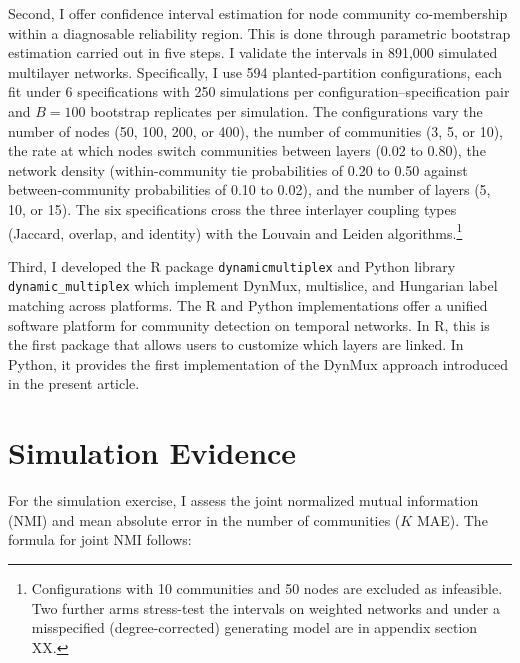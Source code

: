 \documentclass[11pt, letterpaper]{article}
\begin{document}
Second, I offer confidence interval estimation for node community co-membership within a diagnosable reliability region. This is done through parametric bootstrap estimation carried out in five steps. I validate the intervals in 891,000 simulated multilayer networks. Specifically, I use 594 planted-partition configurations, each fit under 6 specifications with 250 simulations per configuration--specification pair and $B = 100$ bootstrap replicates per simulation. The configurations vary the number of nodes (50, 100, 200, or 400), the number of communities (3, 5, or 10), the rate at which nodes switch communities between layers (0.02 to 0.80), the network density (within-community tie probabilities of 0.20 to 0.50 against between-community probabilities of 0.10 to 0.02), and the number of layers (5, 10, or 15). The six specifications cross the three interlayer coupling types (Jaccard, overlap, and identity) with the Louvain and Leiden algorithms.\footnote{Configurations with 10 communities and 50 nodes are excluded as infeasible. Two further arms stress-test the intervals on weighted networks and under a misspecified (degree-corrected) generating model are in appendix section XX.}

Third, I developed the R package \texttt{dynamicmultiplex} and Python library \texttt{dynamic\_multiplex} which implement DynMux, multislice, and Hungarian label matching across platforms. The R and Python implementations offer a unified software platform for  community detection on temporal networks. In R, this is the first package that allows users to customize which layers are linked. In Python, it provides the first implementation of the DynMux approach introduced in the present article.


\section{Simulation Evidence}
For the simulation exercise, I assess the joint normalized mutual information (NMI) \citep{danon2005comparing} and mean absolute error in the number of communities ($K$ MAE). The formula for joint NMI follows: 
\end{document}
